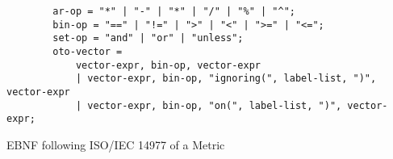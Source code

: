 %
%	
\begin{listing}[H]
	\begin{samepage}
		\begin{verbatim}
		ar-op = "*" | "-" | "*" | "/" | "%" | "^";
		bin-op = "==" | "!=" | ">" | "<" | ">=" | "<=";
		set-op = "and" | "or" | "unless";
		oto-vector = 
			vector-expr, bin-op, vector-expr
			| vector-expr, bin-op, "ignoring(", label-list, ")", vector-expr
			| vector-expr, bin-op, "on(", label-list, ")", vector-expr;
		\end{verbatim}
		\caption{EBNF following ISO/IEC 14977 of a Metric}
	\end{samepage}
\end{listing}